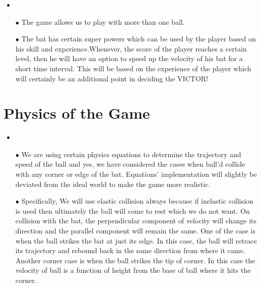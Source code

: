 \documentclass[10pt]{asme2ej}
\begin{document}
\begin{itemize}
\item \newline
\item [$\bullet$]The game allows us to play with more than one ball.\newline
\item [$\bullet$] The bat has certain super powers which can be used by the player based on his skill and experience.Whenever, the score of the player reaches a certain level, then he will have an option to speed up the velocity of his bat for a short time interval. This will be based on the experience of the player which will certainly be an additional point in deciding the VICTOR!
\end{itemize}
\section{Physics of the Game}
\begin{itemize}
\item \newline
\item [$\bullet$] We are using certain physics equations to determine the trajectory and speed of the ball and yes, we have considered the cases when ball'd collide with any corner or edge of the bat. Equations' implementation will slightly be deviated from the ideal world to make the game more realistic.\newline
\item [$\bullet$] Specifically, We will use elastic collision always because if inelastic collision is used then ultimately the ball will come to rest which we do not want. On collision with the bat, the perpendicular component of velocity will change its direction and the parallel component will remain the same. One of the case is when the ball strikes the bat at just its edge. In this case, the ball will retrace its trajectory and rebound back in the same direction from where it came. Another corner case is when the ball strikes the tip of corner. In  this case the velocity of ball is a function of height from the base of ball where it hits the corner. 
\end{itemize}
\end{document}
